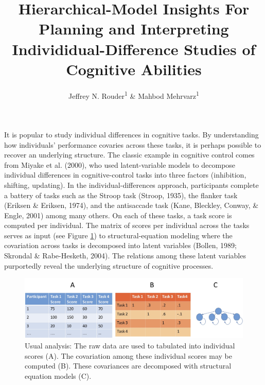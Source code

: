 \documentclass[
  ,man]{apa6}
\title{Hierarchical-Model Insights For Planning and Interpreting Individidual-Difference Studies of Cognitive Abilities}
\author{Jeffrey N. Rouder\textsuperscript{1} \& Mahbod Mehrvarz\textsuperscript{1}}
\date{}
\affiliation{\vspace{0.5cm}\textsuperscript{1} University of California, Irvine}
\begin{document}
\maketitle

It is popular to study individual differences in cognitive tasks. By understanding how individuals' performance covaries across these tasks, it is perhaps possible to recover an underlying structure. The classic example in cognitive control comes from Miyake et al. (2000), who used latent-variable models to decompose individual differences in cognitive-control tasks into three factors (inhibition, shifting, updating). In the individual-differences approach, participants complete a battery of tasks such as the Stroop task (Stroop, 1935), the flanker task (Eriksen \& Eriksen, 1974), and the antisaccade task (Kane, Bleckley, Conway, \& Engle, 2001) among many others. On each of these tasks, a task score is computed per individual. The matrix of scores per individual across the tasks serves as input (see Figure \ref{fig:usual}) to structural-equation modeling where the covariation across tasks is decomposed into latent variables (Bollen, 1989; Skrondal \& Rabe-Hesketh, 2004). The relations among these latent variables purportedly reveal the underlying structure of cognitive processes.

\begin{figure}
\includegraphics[width=5in]{dataAnalysis} \caption{Usual analysis: The raw data are used to tabulated into individual scores (A). The covariation among these individual scores may be computed (B).  These covariances are decomposed with structural equation models (C).}\label{fig:usual}
\end{figure}
\end{document}
